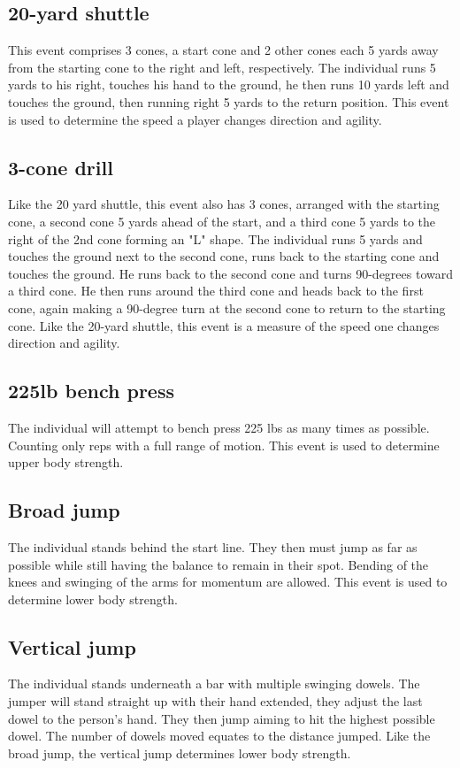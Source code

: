 \documentclass[confrence]{IEEEtran}
\begin{document}
\subsection*{20-yard shuttle}
This event comprises 3 cones, a start cone and 2 other cones each 5 yards away from the starting cone to the right and left, respectively.
The individual runs 5 yards to his right, touches his hand to the ground, he then runs 10 yards left and touches the ground, then running right 5 yards to the return position.
This event is used to determine the speed a player changes direction and agility.
\subsection*{3-cone drill}
Like the 20 yard shuttle, this event also has 3 cones, arranged with the starting cone, a second cone 5 yards ahead of the start, and a third cone 5 yards to the right of the 2nd cone forming an "L" shape.
The individual runs 5 yards and touches the ground next to the second cone, runs back to the starting cone and touches the ground.
He runs back to the second cone and turns 90-degrees toward a third cone.
He then runs around the third cone and heads back to the first cone, again making a 90-degree turn at the second cone to return to the starting cone.
Like the 20-yard shuttle, this event is a measure of the speed one changes direction and agility.
\subsection*{225lb bench press}
The individual will attempt to bench press 225 lbs as many times as possible.
Counting only reps with a full range of motion.
This event is used to determine upper body strength.
\subsection*{Broad jump}
The individual stands behind the start line.
They then must jump as far as possible while still having the balance to remain in their spot.
Bending of the knees and swinging of the arms for momentum are allowed.
This event is used to determine lower body strength.
\subsection*{Vertical jump}
The individual stands underneath a bar with multiple swinging dowels.
The jumper will stand straight up with their hand extended, they adjust the last dowel to the person's hand.
They then jump aiming to hit the highest possible dowel.
The number of dowels moved equates to the distance jumped.
Like the broad jump, the vertical jump determines lower body strength.
\end{document}
